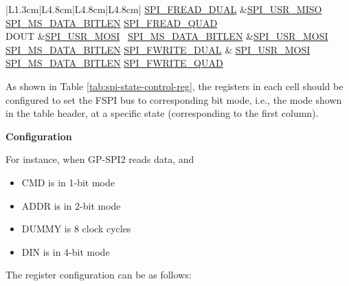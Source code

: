 \documentclass[main\_\_EN.tex]{subfiles}
\begin{document}
\begin{longtable}[c]{ |L{1.3cm}|L{4.8cm}|L{4.8cm}|L{4.8cm}| }
     \hyperref[fielddesc:SPIFREADDUAL]{SPI\_FREAD\_DUAL}
     &\hyperref[fielddesc:SPIUSRMISO]{SPI\_USR\_MISO}
     \hyperref[fielddesc:SPIMSDATABITLEN]{SPI\_MS\_DATA\_BITLEN}
     \hyperref[fielddesc:SPIFREADQUAD]{SPI\_FREAD\_QUAD}\\
     \hline
DOUT &\hyperref[fielddesc:SPIUSRMOSI]{SPI\_USR\_MOSI}       \
      \hyperref[fielddesc:SPIMSDATABITLEN]{SPI\_MS\_DATA\_BITLEN}
     &\hyperref[fielddesc:SPIUSRMOSI]{SPI\_USR\_MOSI}
     \hyperref[fielddesc:SPIMSDATABITLEN]{SPI\_MS\_DATA\_BITLEN}       \hyperref[fielddesc:SPIFWRITEDUAL]{SPI\_FWRITE\_DUAL} &
     \hyperref[fielddesc:SPIUSRMOSI]{SPI\_USR\_MOSI}
     \hyperref[fielddesc:SPIMSDATABITLEN]{SPI\_MS\_DATA\_BITLEN}       \hyperref[fielddesc:SPIFWRITEQUAD]{SPI\_FWRITE\_QUAD} \\
     \hline
\end{longtable}

As shown in Table \ref{tab:spi-state-control-reg}, the registers in each cell should be configured to set the FSPI bus to corresponding bit mode, i.e., the mode shown in the table header, at a specific state (corresponding to the first column).

\textbf{Configuration}

For instance, when GP-SPI2 reads data, and
\begin{itemize}
    \item CMD is in 1-bit mode
    \item ADDR is in 2-bit mode
    \item DUMMY is 8 clock cycles
    \item DIN is in 4-bit mode
\end{itemize}
The register configuration can be as follows:
\end{document}
